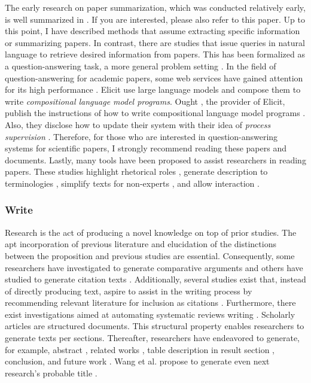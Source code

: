 \documentclass{article}
\begin{document}
The early research on paper summarization, which was conducted relatively early, is well summarized in \cite{altmami2022automatic}. If you are interested, please also refer to this paper.
Up to this point, I have described methods that assume extracting specific information or summarizing papers. In contrast, there are studies that issue queries in natural language to retrieve desired information from papers. This has been formalized as a question-answering task, a more general problem setting \cite{lu2022learn,ruggeri2022argscichat,saikh2022scienceqa}. 
In the field of question-answering for academic papers, some web services have gained attention for its high performance \cite{elicit,scispace}. Elicit use large language models and compose them to write \textit{compositional language model programs}. Ought \cite{ought}, the provider of Elicit, publish the instructions of how to write compositional language model programs \cite{primer2022}. Also, they disclose how to update their system with their idea of \textit{process supervision} \cite{reppert2023iterated}. Therefore, for those who are interested in question-answering systems for scientific papers, I strongly recommend reading these papers and documents.
Lastly, many tools have been proposed to assist researchers in reading papers. These studies highlight rhetorical roles \cite{fok2023scim,lauscher2018arguminsci}, generate description to terminologies \cite{august2022generating,head2021augmenting,murthy2022accord}, simplify texts for non-experts \cite{august2022paper,jeblick2022chatgpt}, and allow interaction \cite{kang2022threddy,elicit,scispace}.
\subsubsection{Write}
Research is the act of producing a novel knowledge on top of prior studies. The apt incorporation of previous literature and elucidation of the distinctions between the proposition and previous studies are essential. Consequently, some researchers have investigated to generate comparative arguments \cite{yu2022scientific} and others have studied to generate citation texts \cite{arita2022citation,gu2022controllable,wang2021autocite,xing2020automatic,funkquist2022citebench}. Additionally, several studies exist that, instead of directly producing text, aspire to assist in the writing process by recommending relevant literature for inclusion as citations \cite{farber2020citation,zhang2020dual,duma2019contextual,farber2018cite,gosangi2021use}. Furthermore, there exist investigations aimed at automating systematic reviews writing \cite{dones2022systematic}.
Scholarly articles are structured documents. This structural property enables researchers to generate texts per sections. Thereafter, 
researchers have endeavored to generate, for example, abstract \cite{kumarasinghe2022automatic,gao2022comparing,wang2019paperrobot}, related works \cite{li2022automatic,shah2021generating,liu2023causal}, table description in result section \cite{moosavi2021scigen,moosavi2021learning}, conclusion, and future work \cite{wang2019paperrobot}. Wang et al. propose to generate even next research's probable title \cite{wang2019paperrobot}.
\end{document}
